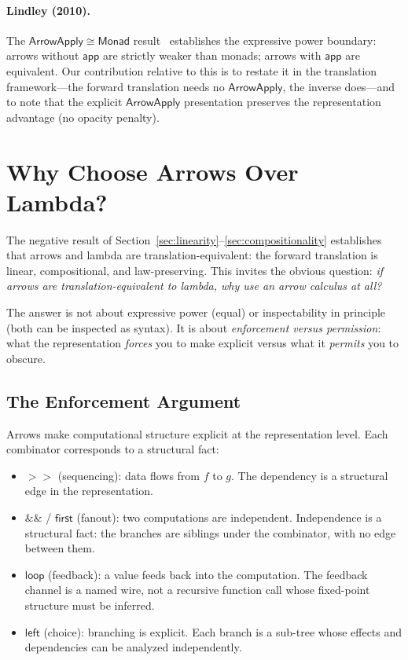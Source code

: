 \documentclass[11pt,a4paper]{article}
\theoremstyle{definition}
\theoremstyle{remark}
\newcommand{\comp}{\mathbin{>\!\!>}}
\newcommand{\first}{\mathsf{first}}
\newcommand{\leftc}{\mathsf{left}}
\newcommand{\loopop}{\mathsf{loop}}
\newcommand{\app}{\mathsf{app}}
\newcommand{\ArrowApply}{\mathsf{ArrowApply}}
\newcommand{\fanout}{\mathbin{\&\!\!\&}}
\begin{document}
\paragraph{Lindley (2010).}
The $\ArrowApply \cong \mathsf{Monad}$ result~\cite{lindley2010embedding}
establishes the expressive power boundary: arrows without $\app$ are
strictly weaker than monads; arrows with $\app$ are equivalent. Our
contribution relative to this is to restate it in the translation
framework---the forward translation needs no $\ArrowApply$, the inverse
does---and to note that the explicit $\ArrowApply$ presentation preserves
the representation advantage (no opacity penalty).

\section{Why Choose Arrows Over Lambda?}\label{sec:why-arrows}

The negative result of Section~\ref{sec:linearity}--\ref{sec:compositionality}
establishes that arrows and lambda are translation-equivalent: the forward
translation is linear, compositional, and law-preserving. This invites the
obvious question: \emph{if arrows are translation-equivalent to lambda, why
use an arrow calculus at all?}

The answer is not about expressive power (equal) or inspectability in
principle (both can be inspected as syntax). It is about
\emph{enforcement versus permission}: what the representation
\emph{forces} you to make explicit versus what it \emph{permits} you to
obscure.

\subsection{The Enforcement Argument}

Arrows make computational structure explicit at the representation level.
Each combinator corresponds to a structural fact:

\begin{itemize}
\item $\comp$ (sequencing): data flows from $f$ to $g$. The dependency
  is a structural edge in the representation.
\item $\fanout$ / $\first$ (fanout): two computations are independent.
  Independence is a structural fact: the branches are siblings under the
  combinator, with no edge between them.
\item $\loopop$ (feedback): a value feeds back into the computation.
  The feedback channel is a named wire, not a recursive function call
  whose fixed-point structure must be inferred.
\item $\leftc$ (choice): branching is explicit. Each branch is a
  sub-tree whose effects and dependencies can be analyzed independently.
\end{itemize}
\end{document}
